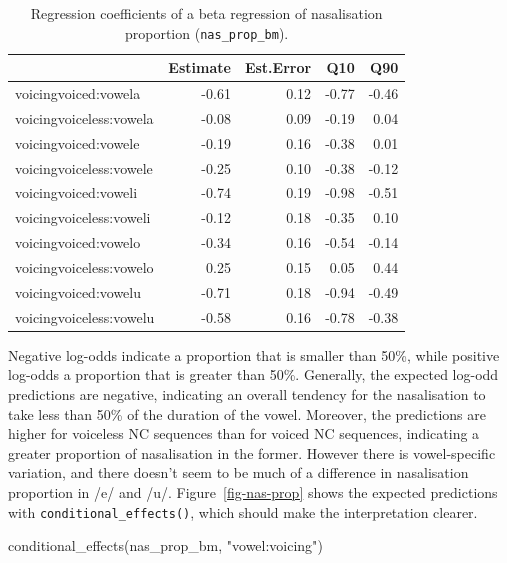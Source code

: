 \documentclass[
  authoryear,
  preprint,
  3p]{elsarticle}
\newenvironment{Shaded}{\begin{snugshade}}{\end{snugshade}}
\newcommand{\FunctionTok}[1]{\textcolor[rgb]{0.28,0.35,0.67}{#1}}
\newcommand{\NormalTok}[1]{\textcolor[rgb]{0.00,0.23,0.31}{#1}}
\newcommand{\StringTok}[1]{\textcolor[rgb]{0.13,0.47,0.30}{#1}}
\begin{document}
\begin{longtable}[]{@{}lrrrr@{}}

\caption{\label{tbl-nas-prop-fixef}Regression coefficients of a beta
regression of nasalisation proportion (\texttt{nas\_prop\_bm}).}

\tabularnewline

\toprule\noalign{}
& Estimate & Est.Error & Q10 & Q90 \\
\midrule\noalign{}
\endhead
\bottomrule\noalign{}
\endlastfoot
voicingvoiced:vowela & -0.61 & 0.12 & -0.77 & -0.46 \\
voicingvoiceless:vowela & -0.08 & 0.09 & -0.19 & 0.04 \\
voicingvoiced:vowele & -0.19 & 0.16 & -0.38 & 0.01 \\
voicingvoiceless:vowele & -0.25 & 0.10 & -0.38 & -0.12 \\
voicingvoiced:voweli & -0.74 & 0.19 & -0.98 & -0.51 \\
voicingvoiceless:voweli & -0.12 & 0.18 & -0.35 & 0.10 \\
voicingvoiced:vowelo & -0.34 & 0.16 & -0.54 & -0.14 \\
voicingvoiceless:vowelo & 0.25 & 0.15 & 0.05 & 0.44 \\
voicingvoiced:vowelu & -0.71 & 0.18 & -0.94 & -0.49 \\
voicingvoiceless:vowelu & -0.58 & 0.16 & -0.78 & -0.38 \\

\end{longtable}

Negative log-odds indicate a proportion that is smaller than 50\%, while
positive log-odds a proportion that is greater than 50\%. Generally, the
expected log-odd predictions are negative, indicating an overall
tendency for the nasalisation to take less than 50\% of the duration of
the vowel. Moreover, the predictions are higher for voiceless NC
sequences than for voiced NC sequences, indicating a greater proportion
of nasalisation in the former. However there is vowel-specific
variation, and there doesn't seem to be much of a difference in
nasalisation proportion in /e/ and /u/. Figure~\ref{fig-nas-prop} shows
the expected predictions with \texttt{conditional\_effects()}, which
should make the interpretation clearer.

\begin{Shaded}
\begin{Highlighting}[]
\FunctionTok{conditional\_effects}\NormalTok{(nas\_prop\_bm, }\StringTok{"vowel:voicing"}\NormalTok{)}
\end{Highlighting}
\end{Shaded}
\end{document}
